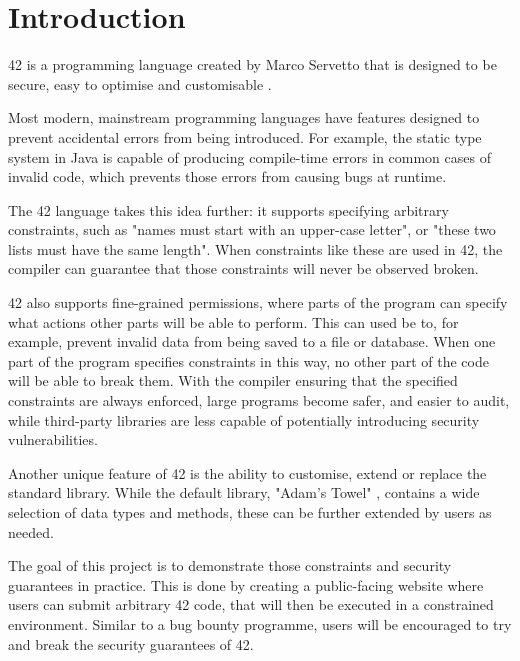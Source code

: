 \newcommand{\code}[1]{\texttt{\textbf{#1}}}
\newcommand{\img}[2]{
\begin{figure}[H]
\fbox{\texttt{[image: \#1]}}
\caption{#2}
\end{figure}}

\setlength{\parindent}{0pt}
\setlength{\fboxsep}{0pt}
\setlength{\fboxrule}{0.5pt}


\chapter{Introduction}\label{C:intro}

42 is a programming language created by Marco Servetto that is designed to be secure, easy to optimise and customisable \cite{servetto-2022A}.

Most modern, mainstream programming languages have features designed to prevent accidental errors from being introduced. For example, the static type system in Java is capable of producing compile-time errors in common cases of invalid code, which prevents those errors from causing bugs at runtime. 

The 42 language takes this idea further: it supports specifying arbitrary constraints, such as "names must start with an upper-case letter", or "these two lists must have the same length". When constraints like these are used in 42, the compiler can guarantee that those constraints will never be observed broken.

42 also supports fine-grained permissions, where parts of the program can specify what actions other parts will be able to perform. This can used be to, for example, prevent invalid data from being saved to a file or database. When one part of the program specifies constraints in this way, no other part of the code will be able to break them. With the compiler ensuring that the specified constraints are always enforced, large programs become safer, and easier to audit, while third-party libraries are less capable of potentially introducing security vulnerabilities.

Another unique feature of 42 is the ability to customise, extend or replace the standard library. While the default library, "Adam's Towel" \cite{servetto-2022B}, contains a wide selection of data types and methods, these can be further extended by users as needed.

The goal of this project is to demonstrate those constraints and security guarantees in practice. This is done by creating a public-facing website where users can submit arbitrary 42 code, that will then be executed in a constrained environment. Similar to a bug bounty programme, users will be encouraged to try and break the security guarantees of 42.

